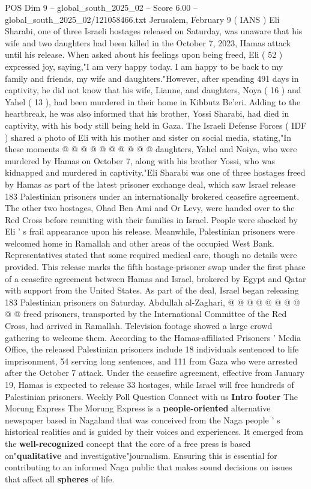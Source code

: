 \begin{textsample}{POS Dim 9 – global\_south\_2025\_02 – Score 6.00 – global\_south\_2025\_02/121058466.txt}  \label{ex:f9_pos_392}
Jerusalem, February 9 ( IANS ) Eli Sharabi, one of three Israeli hostages released on Saturday, was unaware that his wife and two daughters had been killed in the October 7, 2023, Hamas attack until his release.
When asked about his feelings upon being freed, Eli ( 52 ) expressed joy, saying,"I am very happy today.
I am happy to be back to my family and friends, my wife and daughters."However, after spending 491 days in captivity, he did not know that his wife, Lianne, and daughters, Noya ( 16 ) and Yahel ( 13 ), had been murdered in their home in Kibbutz Be'eri.
Adding to the heartbreak, he was also informed that his brother, Yossi Sharabi, had died in captivity, with his body still being held in Gaza.
The Israeli Defense Forces ( IDF ) shared a photo of Eli with his mother and sister on social media, stating,"In these moments @ @ @ @ @ @ @ @ @ @ daughters, Yahel and Noiya, who were murdered by Hamas on October 7, along with his brother Yossi, who was kidnapped and murdered in captivity."Eli Sharabi was one of three hostages freed by Hamas as part of the latest prisoner exchange deal, which saw Israel release 183 Palestinian prisoners under an internationally brokered ceasefire agreement.
The other two hostages, Ohad Ben Ami and Or Levy, were handed over to the Red Cross before reuniting with their families in Israel.
People were shocked by Eli ' s frail appearance upon his release.
Meanwhile, Palestinian prisoners were welcomed home in Ramallah and other areas of the occupied West Bank.
Representatives stated that some required medical care, though no details were provided.
This release marks the fifth hostage-prisoner swap under the first phase of a ceasefire agreement between Hamas and Israel, brokered by Egypt and Qatar with support from the United States.
As part of the deal, Israel began releasing 183 Palestinian prisoners on Saturday.
Abdullah al-Zaghari, @ @ @ @ @ @ @ @ @ @ freed prisoners, transported by the International Committee of the Red Cross, had arrived in Ramallah.
Television footage showed a large crowd gathering to welcome them.
According to the Hamas-affiliated Prisoners ' Media Office, the released Palestinian prisoners include 18 individuals sentenced to life imprisonment, 54 serving long sentences, and 111 from Gaza who were arrested after the October 7 attack.
Under the ceasefire agreement, effective from January 19, Hamas is expected to release 33 hostages, while Israel will free hundreds of Palestinian prisoners.
Weekly Poll Question Connect with us \textbf{Intro} \textbf{footer} The Morung Express The Morung Express is a \textbf{people-oriented} alternative newspaper based in Nagaland that was conceived from the Naga people ' s historical realities and is guided by their voices and experiences.
It emerged from the \textbf{well-recognized} concept that the core of a free press is based on"\textbf{qualitative} and investigative"journalism.
Ensuring this is essential for contributing to an informed Naga public that makes sound decisions on issues that affect all \textbf{spheres} of life.

\end{textsample}
